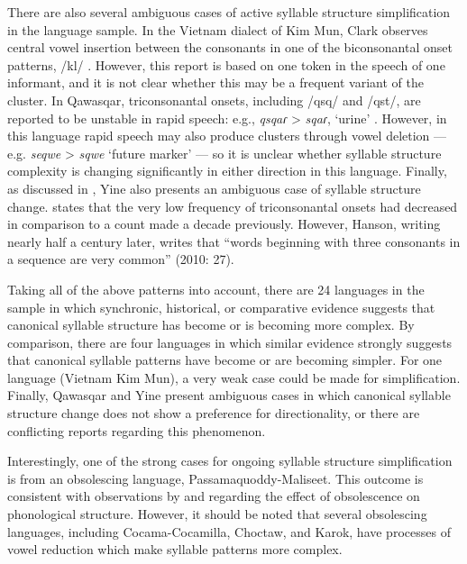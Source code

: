   There are also several ambiguous cases of active syllable structure simplification in the language sample. In the Vietnam dialect of Kim Mun, Clark observes central vowel insertion between the consonants in one of the biconsonantal onset patterns, /kl/ \citep[127]{Clark2008}. However, this report is based on one token in the speech of one informant, and it is not clear whether this may be a frequent variant of the cluster. In Qawasqar, triconsonantal onsets, including /qsq/ and /qst/, are reported to be unstable in rapid speech: e.g., \textit{qsqaɾ} > \textit{sqaɾ}, ‘urine’ \citep[393]{Clairis1985}. However, in this language rapid speech may also produce clusters through vowel deletion — e.g. \textit{seqwe} > \textit{sqwe} ‘future marker’ — so it is unclear whether syllable structure complexity is changing significantly in either direction in this language. Finally, as discussed in , Yine also presents an ambiguous case of syllable structure change. \citet[24]{Matteson1965} states that the very low frequency of triconsonantal onsets had decreased in comparison to a count made a decade previously. However, Hanson, writing nearly half a century later, writes that “words beginning with three consonants in a sequence are very common” (2010: 27).



  Taking all of the above patterns into account, there are 24 languages in the sample in which synchronic, historical, or comparative evidence suggests that canonical syllable structure has become or is becoming more complex. By comparison, there are four languages in which similar evidence strongly suggests that canonical syllable patterns have become or are becoming simpler. For one language (Vietnam Kim Mun), a very weak case could be made for simplification. Finally, Qawasqar and Yine present ambiguous cases in which canonical syllable structure change does not show a preference for directionality, or there are conflicting reports regarding this phenomenon.



  Interestingly, one of the strong cases for ongoing syllable structure simplification is from an obsolescing language, Passamaquoddy-Maliseet. This outcome is consistent with observations by \citet{Romaine2010} and \citet{Cook1989} regarding the effect of obsolescence on phonological structure. However, it should be noted that several obsolescing languages, including Cocama-Cocamilla, Choctaw, and Karok, have processes of vowel reduction which make syllable patterns more complex.



